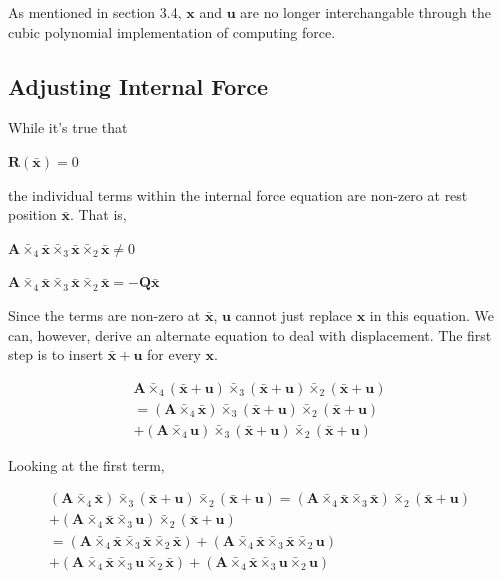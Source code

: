 \documentclass[twocolumn,10pt]{asme2ej}
\begin{document}
As mentioned in section 3.4, $\bm{x}$ and $\bm{u}$ are no longer interchangable through the cubic polynomial implementation of computing force.

\subsection{Adjusting Internal Force}

While it's true that

\begin{center}
$\bm{R}(\bm{\bar{x}}) = 0$
\end{center}

the individual terms within the internal force equation are non-zero at rest position $\bm{\bar{x}}$. That is,

\begin{center}
$\bm{A} \bar{\times}_4 \bm{\bar{x}} \bar{\times}_3 \bm{\bar{x}} \bar{\times}_2 \bm{\bar{x}} \neq 0$

$\bm{A} \bar{\times}_4 \bm{\bar{x}} \bar{\times}_3 \bm{\bar{x}} \bar{\times}_2 \bm{\bar{x}} = -\bm{Q} \bm{\bar{x}}$
\end{center}

Since the terms are non-zero at $\bm{\bar{x}}$, $\bm{u}$ cannot just replace $\bm{x}$ in this equation. We can, however, derive an alternate equation to deal with displacement. The first step is to insert $\bm{\bar{x}} + \bm{u}$ for every $\bm{x}$.

\begin{multline}
\bm{A} \bar{\times}_4 (\bm{\bar{x}} + \bm{u}) \bar{\times}_3 (\bm{\bar{x}} + \bm{u}) \bar{\times}_2 (\bm{\bar{x}}+ \bm{u})
\\ = (\bm{A} \bar{\times}_4 \bm{\bar{x}}) \bar{\times}_3 (\bm{\bar{x}} + \bm{u}) \bar{\times}_2 (\bm{\bar{x}}+ \bm{u})
\\ + (\bm{A} \bar{\times}_4 \bm{u}) \bar{\times}_3 (\bm{\bar{x}} + \bm{u}) \bar{\times}_2 (\bm{\bar{x}}+ \bm{u})
\label{eq_deconstruct}
\end{multline}

Looking at the first term,

\begin{equation}
  \begin{split}
(\bm{A} \bar{\times}_4 \bm{\bar{x}}) \bar{\times}_3 (\bm{\bar{x}} + \bm{u}) \bar{\times}_2 (\bm{\bar{x}}+ \bm{u})
 = (\bm{A} \bar{\times}_4 \bm{\bar{x}} \bar{\times}_3 \bm{\bar{x}} ) \bar{\times}_2 (\bm{\bar{x}}+ \bm{u})
\\ + (\bm{A} \bar{\times}_4 \bm{\bar{x}} \bar{\times}_3 \bm{u} ) \bar{\times}_2 (\bm{\bar{x}}+ \bm{u})
\\ = (\bm{A} \bar{\times}_4 \bm{\bar{x}} \bar{\times}_3 \bm{\bar{x}} \bar{\times}_2 \bm{\bar{x}})
+ (\bm{A} \bar{\times}_4 \bm{\bar{x}} \bar{\times}_3 \bm{\bar{x}} \bar{\times}_2 \bm{u})
\\ + (\bm{A} \bar{\times}_4 \bm{\bar{x}} \bar{\times}_3 \bm{u} \bar{\times}_2 \bm{\bar{x}})
+ (\bm{A} \bar{\times}_4 \bm{\bar{x}} \bar{\times}_3 \bm{u} \bar{\times}_2 \bm{u})
\label{eq_deconstruct1}
\end{split}
\end{equation}
\end{document}
